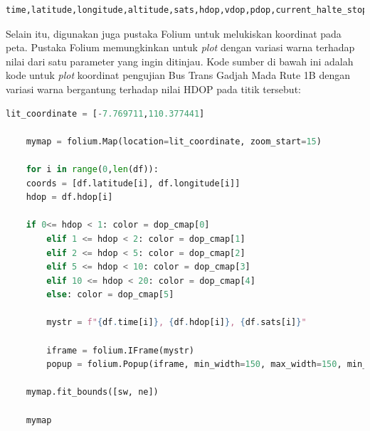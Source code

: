 \begin{lstlisting}
time,latitude,longitude,altitude,sats,hdop,vdop,pdop,current_halte_stop,is_inside_ugm
\end{lstlisting}

Selain itu, digunakan juga pustaka Folium untuk melukiskan koordinat pada peta. Pustaka Folium memungkinkan untuk \textit{plot} dengan variasi warna terhadap nilai dari satu parameter yang ingin ditinjau. Kode sumber di bawah ini adalah kode untuk \textit{plot} koordinat pengujian Bus Trans Gadjah Mada Rute 1B dengan variasi warna bergantung terhadap nilai HDOP pada titik tersebut:

\begin{lstlisting}[language=python]
	lit_coordinate = [-7.769711,110.377441]
	
	mymap = folium.Map(location=lit_coordinate, zoom_start=15)
	
	for i in range(0,len(df)):
	coords = [df.latitude[i], df.longitude[i]]
	hdop = df.hdop[i]
	
	if 0<= hdop < 1: color = dop_cmap[0]
		elif 1 <= hdop < 2: color = dop_cmap[1]
		elif 2 <= hdop < 5: color = dop_cmap[2]
		elif 5 <= hdop < 10: color = dop_cmap[3]
		elif 10 <= hdop < 20: color = dop_cmap[4]
		else: color = dop_cmap[5]
		
		mystr = f"{df.time[i]}, {df.hdop[i]}, {df.sats[i]}"
		
		iframe = folium.IFrame(mystr)
		popup = folium.Popup(iframe, min_width=150, max_width=150, min_height=300, max_height=300)
	
	mymap.fit_bounds([sw, ne]) 
	
	mymap
\end{lstlisting}